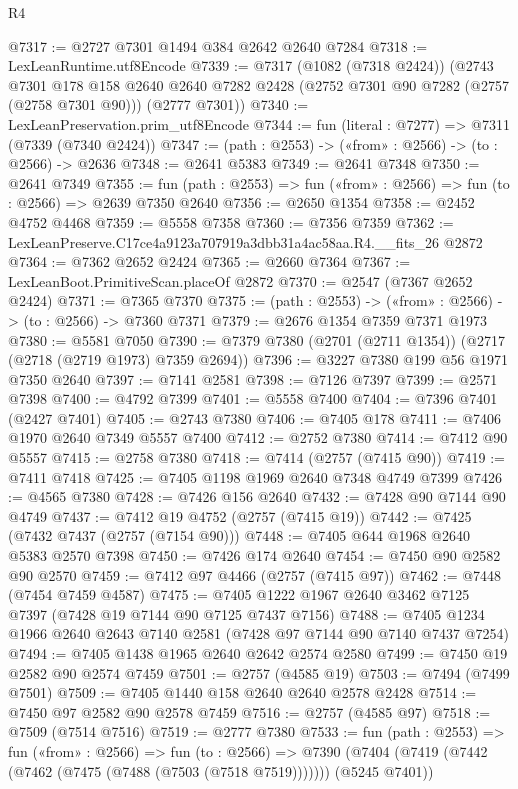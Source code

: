 \begin{lexlean}{R4}
\begin{coremodule}
@7317 := @2727 @7301 @1494 @384 @2642 @2640 @7284
@7318 := LexLeanRuntime.utf8Encode
@7339 := @7317
    (@1082 (@7318 @2424))
    (@2743
      @7301
      @178
      @158
      @2640
      @2640
      @7282
      @2428
      (@2752 @7301 @90 @7282 (@2757 (@2758 @7301 @90)))
      (@2777 @7301))
@7340 := LexLeanPreservation.prim_utf8Encode
@7344 := fun (literal : @7277) => @7311 (@7339 (@7340 @2424))
@7347 := (path : @2553) -> («from» : @2566) -> (to : @2566) -> @2636
@7348 := @2641 @5383
@7349 := @2641 @7348
@7350 := @2641 @7349
@7355 := fun (path : @2553) => fun («from» : @2566) => fun (to : @2566) => @2639 @7350 @2640
@7356 := @2650 @1354
@7358 := @2452 @4752 @4468
@7359 := @5558 @7358
@7360 := @7356 @7359
@7362 := LexLeanPreserve.C17ce4a9123a707919a3dbb31a4ac58aa.R4.__fits_26 @2872
@7364 := @7362 @2652 @2424
@7365 := @2660 @7364
@7367 := LexLeanBoot.PrimitiveScan.placeOf @2872
@7370 := @2547 (@7367 @2652 @2424)
@7371 := @7365 @7370
@7375 := (path : @2553) -> («from» : @2566) -> (to : @2566) -> @7360 @7371
@7379 := @2676 @1354 @7359 @7371 @1973
@7380 := @5581 @7050
@7390 := @7379 @7380 (@2701 (@2711 @1354)) (@2717 (@2718 (@2719 @1973) @7359 @2694))
@7396 := @3227 @7380 @199 @56 @1971 @7350 @2640
@7397 := @7141 @2581
@7398 := @7126 @7397
@7399 := @2571 @7398
@7400 := @4792 @7399
@7401 := @5558 @7400
@7404 := @7396 @7401 (@2427 @7401)
@7405 := @2743 @7380
@7406 := @7405 @178
@7411 := @7406 @1970 @2640 @7349 @5557 @7400
@7412 := @2752 @7380
@7414 := @7412 @90 @5557
@7415 := @2758 @7380
@7418 := @7414 (@2757 (@7415 @90))
@7419 := @7411 @7418
@7425 := @7405 @1198 @1969 @2640 @7348 @4749 @7399
@7426 := @4565 @7380
@7428 := @7426 @156 @2640
@7432 := @7428 @90 @7144 @90 @4749
@7437 := @7412 @19 @4752 (@2757 (@7415 @19))
@7442 := @7425 (@7432 @7437 (@2757 (@7154 @90)))
@7448 := @7405 @644 @1968 @2640 @5383 @2570 @7398
@7450 := @7426 @174 @2640
@7454 := @7450 @90 @2582 @90 @2570
@7459 := @7412 @97 @4466 (@2757 (@7415 @97))
@7462 := @7448 (@7454 @7459 @4587)
@7475 := @7405 @1222 @1967 @2640 @3462 @7125 @7397 (@7428 @19 @7144 @90 @7125 @7437 @7156)
@7488 := @7405 @1234 @1966 @2640 @2643 @7140 @2581 (@7428 @97 @7144 @90 @7140 @7437 @7254)
@7494 := @7405 @1438 @1965 @2640 @2642 @2574 @2580
@7499 := @7450 @19 @2582 @90 @2574 @7459
@7501 := @2757 (@4585 @19)
@7503 := @7494 (@7499 @7501)
@7509 := @7405 @1440 @158 @2640 @2640 @2578 @2428
@7514 := @7450 @97 @2582 @90 @2578 @7459
@7516 := @2757 (@4585 @97)
@7518 := @7509 (@7514 @7516)
@7519 := @2777 @7380
@7533 := fun (path : @2553) =>
  fun («from» : @2566) =>
  fun (to : @2566) =>
  @7390 (@7404 (@7419 (@7442 (@7462 (@7475 (@7488 (@7503 (@7518 @7519))))))) (@5245 @7401))

\end{coremodule}
\end{lexlean}
